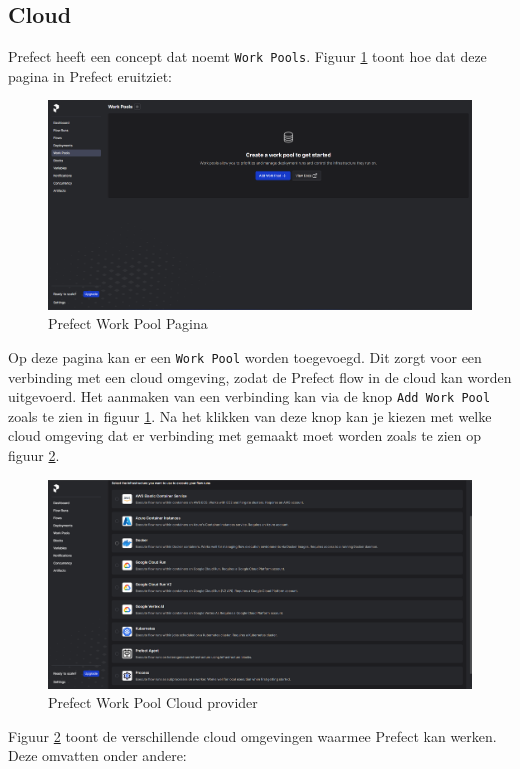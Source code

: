 \subsection{Cloud}
Prefect heeft een concept dat noemt \verb+Work Pools+. Figuur \ref{fig:Prefect_Work_Pools} toont hoe dat deze pagina in Prefect eruitziet:
\begin{figure}[htbp]
    \centering
    \includegraphics[width=0.9\linewidth]{graphics/Prefect_Work_Pools.PNG}
    \caption{Prefect Work Pool Pagina}
    \label{fig:Prefect_Work_Pools}
\end{figure}
Op deze pagina kan er een \verb+Work Pool+ worden toegevoegd. Dit zorgt voor een verbinding met een cloud omgeving, zodat de Prefect flow in de cloud kan worden uitgevoerd. Het aanmaken van een verbinding kan via de knop \verb+Add Work Pool+ zoals te zien in figuur \ref{fig:Prefect_Work_Pools}.
Na het klikken van deze knop kan je kiezen met welke cloud omgeving dat er verbinding met gemaakt moet worden zoals te zien op figuur \ref{fig:Prefect_Work_Pools_Create}.
\begin{figure}[htbp]
    \centering
    \includegraphics[width=0.9\linewidth]{graphics/Prefect_Work_Pools_Create.PNG}
    \caption{Prefect Work Pool Cloud provider}
    \label{fig:Prefect_Work_Pools_Create}
\end{figure}
Figuur \ref{fig:Prefect_Work_Pools_Create} toont de verschillende cloud omgevingen waarmee Prefect kan werken. Deze omvatten onder andere:
